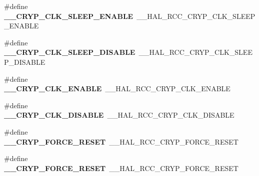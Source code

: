 \begin{DoxyCompactItemize}
\item 
\hypertarget{group___h_a_l___r_c_c___aliased_ga639e05198e1aa4cf5e2f811cfd5478a9}{\#define {\bfseries \-\_\-\-\_\-\-C\-R\-Y\-P\-\_\-\-C\-L\-K\-\_\-\-S\-L\-E\-E\-P\-\_\-\-E\-N\-A\-B\-L\-E}~\-\_\-\-\_\-\-H\-A\-L\-\_\-\-R\-C\-C\-\_\-\-C\-R\-Y\-P\-\_\-\-C\-L\-K\-\_\-\-S\-L\-E\-E\-P\-\_\-\-E\-N\-A\-B\-L\-E}\label{group___h_a_l___r_c_c___aliased_ga639e05198e1aa4cf5e2f811cfd5478a9}

\item 
\hypertarget{group___h_a_l___r_c_c___aliased_gac488d20c2d3434a03757a62b47688854}{\#define {\bfseries \-\_\-\-\_\-\-C\-R\-Y\-P\-\_\-\-C\-L\-K\-\_\-\-S\-L\-E\-E\-P\-\_\-\-D\-I\-S\-A\-B\-L\-E}~\-\_\-\-\_\-\-H\-A\-L\-\_\-\-R\-C\-C\-\_\-\-C\-R\-Y\-P\-\_\-\-C\-L\-K\-\_\-\-S\-L\-E\-E\-P\-\_\-\-D\-I\-S\-A\-B\-L\-E}\label{group___h_a_l___r_c_c___aliased_gac488d20c2d3434a03757a62b47688854}

\item 
\hypertarget{group___h_a_l___r_c_c___aliased_ga044bf8666afaa469662c187c65807fd9}{\#define {\bfseries \-\_\-\-\_\-\-C\-R\-Y\-P\-\_\-\-C\-L\-K\-\_\-\-E\-N\-A\-B\-L\-E}~\-\_\-\-\_\-\-H\-A\-L\-\_\-\-R\-C\-C\-\_\-\-C\-R\-Y\-P\-\_\-\-C\-L\-K\-\_\-\-E\-N\-A\-B\-L\-E}\label{group___h_a_l___r_c_c___aliased_ga044bf8666afaa469662c187c65807fd9}

\item 
\hypertarget{group___h_a_l___r_c_c___aliased_gaab68329f44bc446bbfa67aa7328f28d5}{\#define {\bfseries \-\_\-\-\_\-\-C\-R\-Y\-P\-\_\-\-C\-L\-K\-\_\-\-D\-I\-S\-A\-B\-L\-E}~\-\_\-\-\_\-\-H\-A\-L\-\_\-\-R\-C\-C\-\_\-\-C\-R\-Y\-P\-\_\-\-C\-L\-K\-\_\-\-D\-I\-S\-A\-B\-L\-E}\label{group___h_a_l___r_c_c___aliased_gaab68329f44bc446bbfa67aa7328f28d5}

\item 
\hypertarget{group___h_a_l___r_c_c___aliased_ga01c73ed1328524317b1a87b0c65a8b8a}{\#define {\bfseries \-\_\-\-\_\-\-C\-R\-Y\-P\-\_\-\-F\-O\-R\-C\-E\-\_\-\-R\-E\-S\-E\-T}~\-\_\-\-\_\-\-H\-A\-L\-\_\-\-R\-C\-C\-\_\-\-C\-R\-Y\-P\-\_\-\-F\-O\-R\-C\-E\-\_\-\-R\-E\-S\-E\-T}\label{group___h_a_l___r_c_c___aliased_ga01c73ed1328524317b1a87b0c65a8b8a}

\item 
\hypertarget{group___h_a_l___r_c_c___aliased_ga01c73ed1328524317b1a87b0c65a8b8a}{\#define {\bfseries \-\_\-\-\_\-\-C\-R\-Y\-P\-\_\-\-F\-O\-R\-C\-E\-\_\-\-R\-E\-S\-E\-T}~\-\_\-\-\_\-\-H\-A\-L\-\_\-\-R\-C\-C\-\_\-\-C\-R\-Y\-P\-\_\-\-F\-O\-R\-C\-E\-\_\-\-R\-E\-S\-E\-T}\label{group___h_a_l___r_c_c___aliased_ga01c73ed1328524317b1a87b0c65a8b8a}


\end{DoxyCompactItemize}
